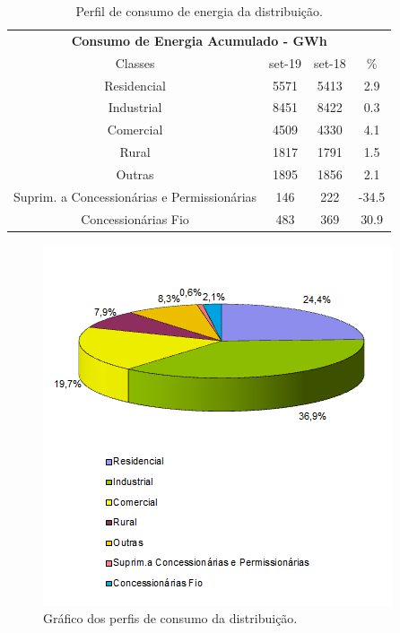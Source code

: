 \documentclass[grad,numbers]{coppe}
\begin{document}
  \begin{table}[H]

  \caption{\label{tab:unnamed-chunk-12}Perfil de consumo de energia da distribuição.}
  \centering
  \begin{tabular}[t]{cccc}
  \toprule
  \multicolumn{4}{c}{\textbf{Consumo de Energia Acumulado - GWh}} \\
  \cmidrule(l{3pt}r{3pt}){1-4}
  Classes & set-19 & set-18 & \%\\
  \midrule
  Residencial & 5571 & 5413 & 2.9\\
  Industrial & 8451 & 8422 & 0.3\\
  Comercial & 4509 & 4330 & 4.1\\
  Rural & 1817 & 1791 & 1.5\\
  Outras & 1895 & 1856 & 2.1\\
  \addlinespace
  Suprim. a Concessionárias e Permissionárias & 146 & 222 & -34.5\\
  Concessionárias Fio & 483 & 369 & 30.9\\
  \bottomrule
  \end{tabular}
  \end{table}
  \begin{figure}[H]
  \includegraphics[width=1\linewidth]{img/consumo_dist} \caption{Gráfico dos perfis de consumo da distribuição.}\label{fig:unnamed-chunk-13}
  \end{figure}
\end{document}
